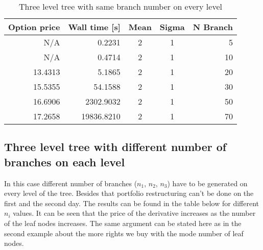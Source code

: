 \documentclass[11pt]{article}
\begin{document}
\begin{table}[h!]
  \begin{center}
    \begin{tabular}{rrccr}
      \textbf{Option price} & \textbf{Wall time [s]} & \textbf{Mean} & \textbf{Sigma} & \textbf{N Branch} \\
      \hline
      N/A       & 0.2231           & 2    &     1 & 5  \\
      N/A       & 0.4714           & 2    &     1 & 10 \\
      13.4313   & 5.1865           & 2    &     1 & 20 \\
      15.5355   & 54.1588          & 2    &     1 & 30 \\
      16.6906   & 2302.9032        & 2    &     1 & 50 \\
      17.2658   & 19836.8210       & 2    &     1 & 70 \\
     \end{tabular}
    \caption{Three level tree with same branch number on every level}
  \end{center}
\end{table}

\subsection{Three level tree with different number of branches on each level}
In this case different number of branches ($n_1$, $n_2$, $n_3$) have to be generated on every level of the tree. Besides that portfolio restructuring can't be done on the first and the second day. The results can be found in the table below for different $n_i$ values. It can be seen that the price of the derivative increases as the number of the leaf nodes increases. The same argument can be stated here as in the second example about the more rights we buy with the mode number of leaf nodes.
 
\end{document}
